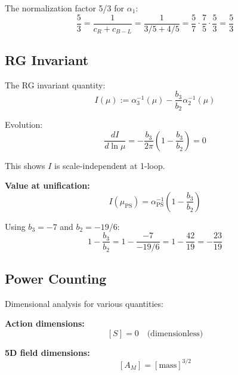 \documentclass[11pt,a4paper]{article}
\theoremstyle{definition}
\begin{document}
The normalization factor 5/3 for $\alpha_1$:
\begin{equation}
  \label{eq:alpha1-norm}
  \frac{5}{3} = \frac{1}{c_R + c_{B-L}} = \frac{1}{3/5 + 4/5} = \frac{5}{7} \cdot \frac{7}{5} \cdot \frac{5}{3} = \frac{5}{3}
\end{equation}

\subsection{RG Invariant}
\label{subsec:rg-invariant}

The RG invariant quantity:
\begin{equation}
  \label{eq:rg-inv-def}
  I(\mu) := \alpha_3^{-1}(\mu) - \frac{b_3}{b_2}\alpha_2^{-1}(\mu)
\end{equation}

Evolution:
\begin{equation}
  \label{eq:rg-inv-evol}
  \frac{dI}{d\ln\mu} = -\frac{b_3}{2\pi}\left(1 - \frac{b_3}{b_2}\right) = 0
\end{equation}

This shows $I$ is scale-independent at 1-loop.

\textbf{Value at unification:}
\begin{equation}
  \label{eq:rg-inv-unif}
  I(\mu_{\text{PS}}) = \alpha_{\text{PS}}^{-1}\left(1 - \frac{b_3}{b_2}\right)
\end{equation}

Using $b_3 = -7$ and $b_2 = -19/6$:
\begin{equation}
  \label{eq:rg-inv-value}
  1 - \frac{b_3}{b_2} = 1 - \frac{-7}{-19/6} = 1 - \frac{42}{19} = -\frac{23}{19}
\end{equation}

\subsection{Power Counting}
\label{subsec:power-count}

Dimensional analysis for various quantities:

\textbf{Action dimensions:}
\begin{equation}
  \label{eq:dim-action}
  [S] = 0 \quad \text{(dimensionless)}
\end{equation}

\textbf{5D field dimensions:}
\begin{equation}
  \label{eq:dim-5d-field}
  [A_M] = [\text{mass}]^{3/2}
\end{equation}
\end{document}
